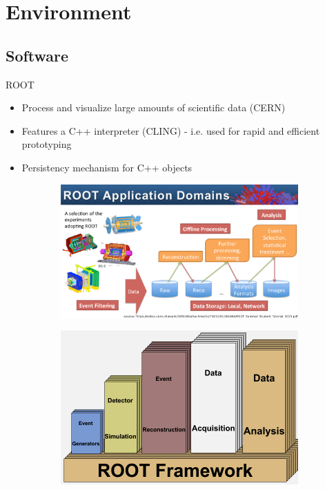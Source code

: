 \section{Environment}

\subsection{Software}
\begin{frame}{ROOT}
    \begin{itemize}
      \item Process and visualize large amounts of scientific data (CERN)
      \item Features a C++ interpreter (CLING) - i.e. used for rapid and efficient prototyping
      \item Persistency mechanism for C++ objects
    \end{itemize}


  \begin{figure}[htb]
    \centering
    \begin{subfigure}[b]{0.5\textwidth}
      \includegraphics[width=0.97\linewidth, keepaspectratio]{./resources/root_application_domains.png}
      \nocite{cern:root:tut}
    \end{subfigure}%
    \begin{subfigure}[b]{0.5\textwidth}
      \includegraphics[width=0.97\linewidth, keepaspectratio]{./resources/root_application_domains2.png}
      \nocite{cern:root:domains}
    \end{subfigure}
  \end{figure}
\end{frame}

